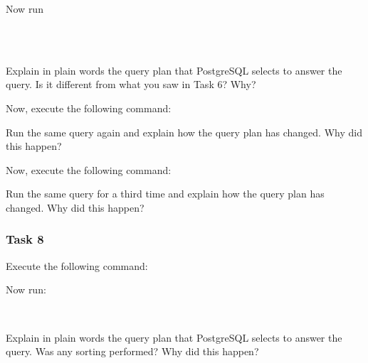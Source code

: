 \noindent {}

\vgap

\noindent Now run

\vgap

\noindent {} \\
\noindent {} \\
\noindent {}

\vgap

\noindent Explain in plain words the query plan that PostgreSQL selects to answer the query. Is it different from what you saw in Task 6? Why?

\vgap

\noindent Now, execute the following command:

\vgap

\noindent {}

\vgap

\noindent Run the same query again and explain how the query plan has changed. Why did this happen?

\vgap

\noindent Now, execute the following command:

\vgap

\noindent {}

\vgap

\noindent Run the same query for a third time and explain how the query plan has changed. Why did this happen?

\subsubsection{Task 8}

Execute the following command:

\vgap

\noindent {}

\vgap

\noindent Now run:

\vgap

\noindent {} \\

\vgap

\noindent Explain in plain words the query plan that PostgreSQL selects to answer the query. Was any sorting performed? Why did this happen?

